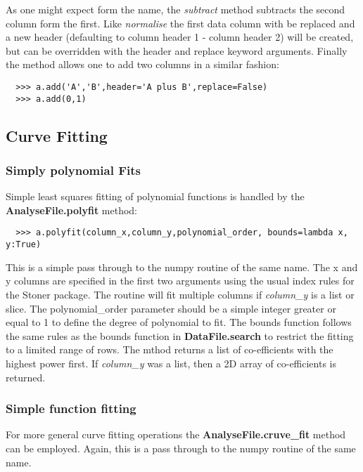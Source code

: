 \documentclass[a4paper,11pt]{scrartcl}
\begin{document}
As one might expect form the name, the \textit{subtract} method subtracts the second column form the first. Like \textit{normalise} the first data column with be replaced and a new header (defaulting to column header 1 - column header 2) will be created, but can be overridden with the header and replace keyword arguments. Finally the  method allows one to add two columns in a similar fashion:

\begin{verbatim}
  >>> a.add('A','B',header='A plus B',replace=False)
  >>> a.add(0,1)
\end{verbatim}




\subsection{Curve Fitting}

\subsubsection{Simply polynomial Fits}

Simple least squares fitting of polynomial functions is handled by the
\textbf{AnalyseFile.polyfit} method:

\begin{verbatim}
  >>> a.polyfit(column_x,column_y,polynomial_order, bounds=lambda x, y:True)
\end{verbatim}

This is a simple pass through to the numpy routine of the same name. The x and y
columns are specified in the first two arguments using the usual index rules for
the Stoner package. The routine will fit multiple columns if \textit{column\_y}
is a list or slice. The polynomial\_order parameter should be a simple integer
greater or equal to 1 to define the degree of polynomial to fit. The bounds
function follows the same rules as the bounds function in
\textbf{DataFile.search} to restrict the fitting to a limited range of rows. The
mthod returns a list of co-efficients with the highest power first. If
\textit{column\_y} was a list, then a 2D array of co-efficients is returned.

\subsubsection{Simple function fitting}

For more general curve fitting operations the \textbf{AnalyseFile.cruve\_fit}
method can be employed. Again, this is a pass through to the numpy routine of
the same name.
\end{document}

